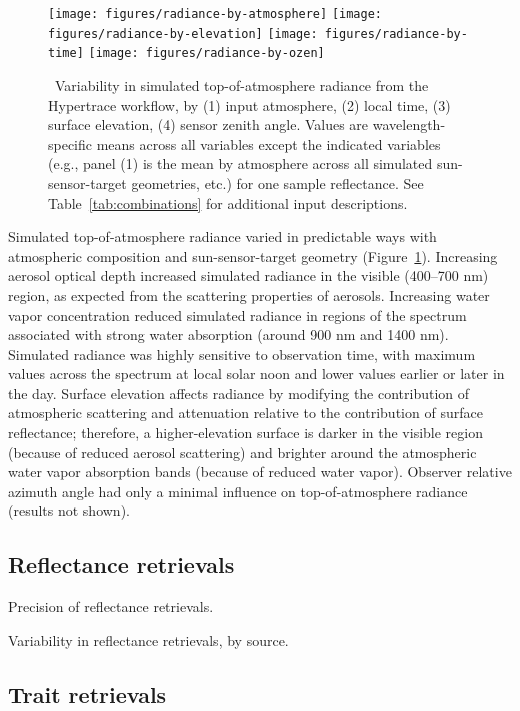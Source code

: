 \documentclass[draft]{agujournal2019}
\begin{document}
\begin{figure}[ht]
  \centering
  \texttt{[image: figures/radiance-by-atmosphere]}
  \texttt{[image: figures/radiance-by-elevation]}
  \texttt{[image: figures/radiance-by-time]}
  \texttt{[image: figures/radiance-by-ozen]}
  \caption{\label{fig:radiance}\
    Variability in simulated top-of-atmosphere radiance from the Hypertrace workflow, by
    (1) input atmosphere,
    (2) local time,
    (3) surface elevation,
    (4) sensor zenith angle.
    Values are wavelength-specific means across all variables except the indicated variables
    (e.g., panel (1) is the mean by atmosphere across all simulated sun-sensor-target geometries, etc.)
    for one sample reflectance.
    See Table~\ref{tab:combinations} for additional input descriptions.
  }
\end{figure}

Simulated top-of-atmosphere radiance varied in predictable ways with atmospheric composition and sun-sensor-target geometry (Figure~\ref{fig:radiance}).
Increasing aerosol optical depth increased simulated radiance in the visible (400--700 nm) region, as expected from the scattering properties of aerosols.
Increasing water vapor concentration reduced simulated radiance in regions of the spectrum associated with strong water absorption (around 900 nm and 1400 nm).
Simulated radiance was highly sensitive to observation time, with maximum values across the spectrum at local solar noon and lower values earlier or later in the day.
Surface elevation affects radiance by modifying the contribution of atmospheric scattering and attenuation relative to the contribution of surface reflectance;
therefore, a higher-elevation surface is darker in the visible region (because of reduced aerosol scattering) and brighter around the atmospheric water vapor absorption bands (because of reduced water vapor).
Observer relative azimuth angle had only a minimal influence on top-of-atmosphere radiance (results not shown).

\subsection{Reflectance retrievals}\label{subsec:results-reflectance}

Precision of reflectance retrievals.

Variability in reflectance retrievals, by source.

\subsection{Trait retrievals}\label{subsec:results-traits}
\end{document}
